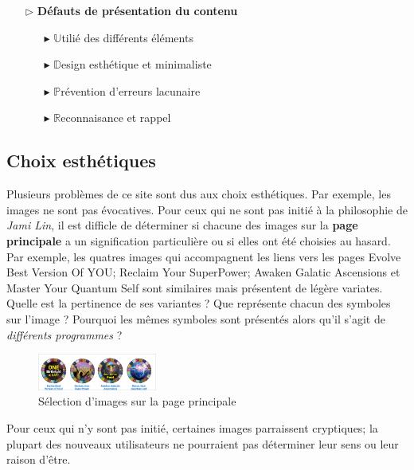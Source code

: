 \documentclass[9pt]{report}
\newcommand{\mathpazott}{\fontfamily{pplj}\selectfont}
\renewcommand{\texttt}[1]{{\scriptsize\mathpazott #1}}
\begin{document}
\begin{multicols*}{2}
  \begin{itemize}
    \item [$\rhd$ ] \textbf{Défauts de présentation du contenu}  
      \begin{itemize}
        \item [$\blacktriangleright$ ] $\mathbb{U}$tilié des différents éléments 
        \item [$\blacktriangleright$ ] $\mathbb{D}$esign esthétique et minimaliste 
        \item [$\blacktriangleright$ ] $\mathbb{P}$révention d'erreurs lacunaire
        \item [$\blacktriangleright$ ] $\mathbb{R}$econnaisance et rappel
      \end{itemize}
  \end{itemize}
  \vspace{-1em}


  \subsection{Choix esthétiques}
  Plusieurs problèmes de ce site sont dus aux choix esthétiques. 
  Par exemple, les images ne sont pas évocatives. Pour ceux qui ne sont pas 
  initié à la philosophie de \textit{Jami Lin}, il est difficle de 
  déterminer si chacune des images sur la \textbf{page principale} a un signification 
  particulière ou si elles ont été choisies au hasard. Par exemple, 
  les quatres images qui accompagnent les liens vers les pages 
  \texttt{Evolve Best Version Of YOU}; \texttt{Reclaim Your SuperPower}; 
  \texttt{Awaken Galatic Ascensions} et \texttt{Master Your Quantum Self} sont 
  similaires mais présentent de légère variates. Quelle est la pertinence de ses variantes ?
  Que représente chacun des symboles sur l'image ? Pourquoi les mêmes 
  symboles sont présentés alors qu'il s'agit de \textit{différents programmes} ?   
  \begin{figure}[H]
    \begin{center}
      \includegraphics[width=0.35\textwidth]{ImagesConfondantes.png}
    \end{center}
    \caption{Sélection d'images sur la page principale}
  \end{figure}

  Pour ceux qui n'y sont pas initié, certaines images parraissent 
  cryptiques; la plupart des nouveaux utilisateurs ne pourraient pas 
  déterminer leur sens ou leur raison d'être. 


\end{multicols*}
\end{document}
